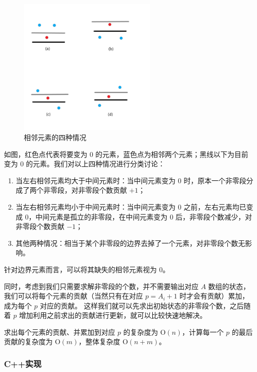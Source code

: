 \begin{figure}[H]
    \centering
    \includegraphics[width=0.6\textwidth]{image/23/2-1.png}
    \caption{相邻元素的四种情况}
\end{figure}

如图，红色点代表将要变为 $0$ 的元素，蓝色点为相邻两个元素；黑线以下为目前变为 $0$ 的元素。我们对以上四种情况进行分类讨论：

\begin{enumerate}
    \item 当左右相邻元素均大于中间元素时：当中间元素变为 $0$ 时，原本一个非零段分成了两个非零段，对非零段个数贡献 $+1$；
    \item 当左右相邻元素均小于中间元素时：当中间元素变为 $0$ 之前，左右元素均已变成 $0$，中间元素是孤立的非零段，在中间元素变为 $0$ 后，非零段个数减少，对非零段个数贡献 $-1$；
    \item 其他两种情况：相当于某个非零段的边界去掉了一个元素，对非零段个数无影响。
\end{enumerate}

针对边界元素而言，可以将其缺失的相邻元素视为 $0$。

同时，考虑到我们只需要求解非零段的个数，并不需要输出对应 $A$ 数组的状态，我们可以将每个元素的贡献（当然只有在对应 $p=A_{i}+1$ 时才会有贡献）累加，成为每个 $p$ 对应的贡献。
这样我们就可以先求出初始状态的非零段个数，之后随着 $p$ 增加利用之前求出的贡献进行更新，就可以比较快速地解决。

求出每个元素的贡献、并累加到对应 $p$ 的复杂度为 $\mathrm{O}(n)$，计算每一个 $p$ 的最后贡献的复杂度为 $\mathrm{O}(m)$，整体复杂度 $\mathrm{O}(n+m)$。

\subsubsection{C++实现}

